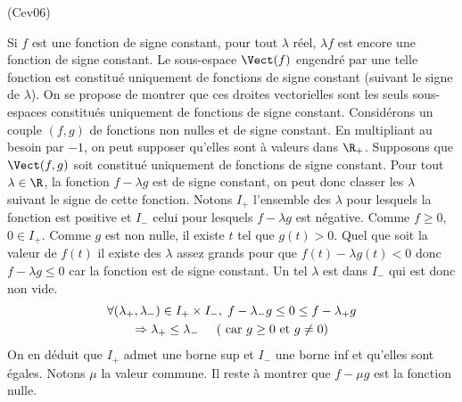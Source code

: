 \begin{tiny}(Cev06)\end{tiny} Si $f$ est une fonction de signe constant, pour tout $\lambda$ réel, $\lambda f$ est encore une fonction de signe constant. Le sous-espace $\Vect(f)$ engendré par une telle fonction est constitué uniquement de fonctions de signe constant (suivant le signe de $\lambda$).\newline
On se propose de montrer que ces droites vectorielles sont les seuls sous-espaces constitués uniquement de fonctions de signe constant.\newline
Considérons un couple $(f,g)$ de fonctions non nulles et de signe constant. En multipliant au besoin par $-1$, on peut supposer qu'elles sont à valeurs dans $\R_+$. Supposons que $\Vect(f,g)$ soit constitué uniquement de fonctions de signe constant.\newline
Pour tout $\lambda \in \R$, la fonction $f - \lambda g$ est de signe constant, on peut donc classer les $\lambda$ suivant le signe de cette fonction. Notons $I_+$ l'ensemble des $\lambda$ pour lesquels la fonction est positive et $I_-$ celui pour lesquels $f-\lambda g$ est négative.\newline
Comme $f \geq 0$, $0 \in I_+$. Comme $g$ est non nulle, il existe $t$ tel que $g(t)>0$. Quel que soit la valeur de $f(t)$ il existe des $\lambda$ assez grands pour que $f(t) - \lambda g(t) < 0$ donc $f - \lambda g \leq 0$ car la fonction est de signe constant. Un tel $\lambda$ est dans $I_-$ qui est donc non vide.
\begin{multline*}
 \forall(\lambda_+, \lambda_-)\in I_+\times I_-,\;
 f - \lambda_-g \leq 0 \leq f - \lambda_+ g \\
 \Rightarrow \lambda_+ \leq \lambda_- \hspace{0.5cm} (\text{ car } g\geq 0 \text{ et } g \neq 0)
\end{multline*}
On en déduit que $I_+$ admet une borne sup et $I_-$ une borne inf et qu'elles sont égales. Notons $\mu$ la valeur commune. Il reste à montrer que $f - \mu g$ est la fonction nulle.